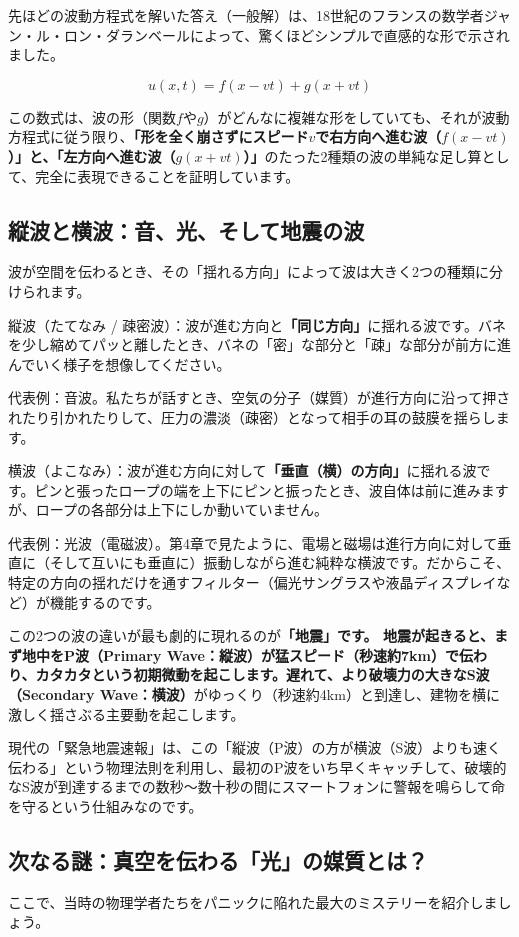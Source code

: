 先ほどの波動方程式を解いた答え（一般解）は、18世紀のフランスの数学者ジャン・ル・ロン・ダランベールによって、驚くほどシンプルで直感的な形で示されました。

\[u(x,t) = f(x - vt) + g(x + vt)\]

この数式は、波の形（関数\(f\)や\(g\)）がどんなに複雑な形をしていても、それが波動方程式に従う限り、\textbf{「形を全く崩さずにスピード\(v\)で右方向へ進む波（\(f(x - vt)\)）」と、「左方向へ進む波（\(g(x + vt)\)）」}のたった2種類の波の単純な足し算として、完全に表現できることを証明しています。

\subsection{縦波と横波：音、光、そして地震の波}

波が空間を伝わるとき、その「揺れる方向」によって波は大きく2つの種類に分けられます。

縦波（たてなみ / 疎密波）：波が進む方向と\textbf{「同じ方向」}に揺れる波です。バネを少し縮めてパッと離したとき、バネの「密」な部分と「疎」な部分が前方に進んでいく様子を想像してください。

代表例：音波。私たちが話すとき、空気の分子（媒質）が進行方向に沿って押されたり引かれたりして、圧力の濃淡（疎密）となって相手の耳の鼓膜を揺らします。

横波（よこなみ）：波が進む方向に対して\textbf{「垂直（横）の方向」}に揺れる波です。ピンと張ったロープの端を上下にピンと振ったとき、波自体は前に進みますが、ロープの各部分は上下にしか動いていません。

代表例：光波（電磁波）。第4章で見たように、電場と磁場は進行方向に対して垂直に（そして互いにも垂直に）振動しながら進む純粋な横波です。だからこそ、特定の方向の揺れだけを通すフィルター（偏光サングラスや液晶ディスプレイなど）が機能するのです。

この2つの波の違いが最も劇的に現れるのが\textbf{「地震」です。 地震が起きると、まず地中をP波（Primary Wave：縦波）が猛スピード（秒速約7km）で伝わり、カタカタという初期微動を起こします。遅れて、より破壊力の大きなS波（Secondary Wave：横波）}がゆっくり（秒速約4km）と到達し、建物を横に激しく揺さぶる主要動を起こします。

現代の「緊急地震速報」は、この「縦波（P波）の方が横波（S波）よりも速く伝わる」という物理法則を利用し、最初のP波をいち早くキャッチして、破壊的なS波が到達するまでの数秒〜数十秒の間にスマートフォンに警報を鳴らして命を守るという仕組みなのです。

\subsection{次なる謎：真空を伝わる「光」の媒質とは？}
ここで、当時の物理学者たちをパニックに陥れた最大のミステリーを紹介しましょう。

